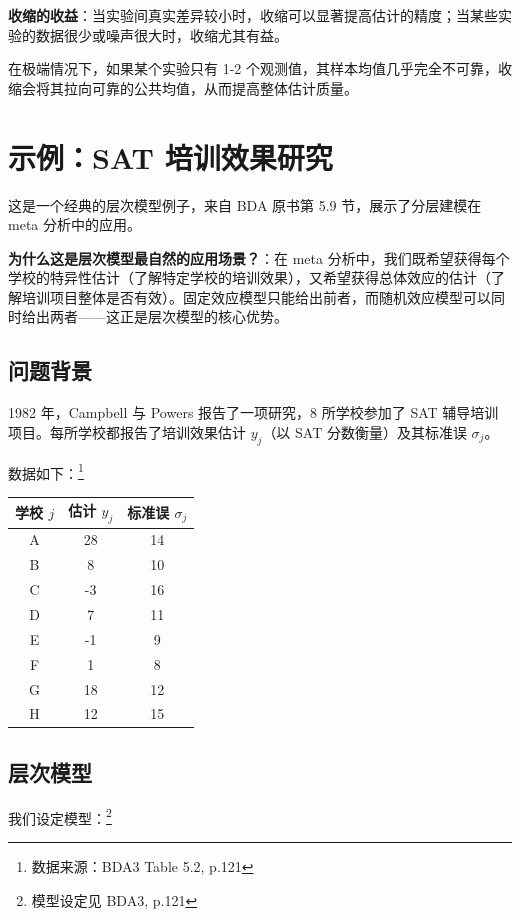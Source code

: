 \textbf{收缩的收益}：当实验间真实差异较小时，收缩可以显著提高估计的精度；当某些实验的数据很少或噪声很大时，收缩尤其有益。

在极端情况下，如果某个实验只有 1-2 个观测值，其样本均值几乎完全不可靠，收缩会将其拉向可靠的公共均值，从而提高整体估计质量。

\section{示例：SAT 培训效果研究}

这是一个经典的层次模型例子，来自 BDA 原书第 5.9 节，展示了分层建模在 meta 分析中的应用。

\textbf{为什么这是层次模型最自然的应用场景？}：在 meta 分析中，我们既希望获得每个学校的特异性估计（了解特定学校的培训效果），又希望获得总体效应的估计（了解培训项目整体是否有效）。固定效应模型只能给出前者，而随机效应模型可以同时给出两者——这正是层次模型的核心优势。

\subsection{问题背景}

1982 年，Campbell 与 Powers 报告了一项研究，8 所学校参加了 SAT 辅导培训项目。每所学校都报告了培训效果估计 $y_j$（以 SAT 分数衡量）及其标准误 $\sigma_j$。

数据如下：\footnote{数据来源：BDA3 Table 5.2, p.121}

\begin{center}
\begin{tabular}{ccc}
\hline
学校 $j$ & 估计 $y_j$ & 标准误 $\sigma_j$ \\
\hline
A & 28 & 14 \\
B & 8 & 10 \\
C & -3 & 16 \\
D & 7 & 11 \\
E & -1 & 9 \\
F & 1 & 8 \\
G & 18 & 12 \\
H & 12 & 15 \\
\hline
\end{tabular}
\end{center}

\subsection{层次模型}

我们设定模型：\footnote{模型设定见 BDA3, p.121}


